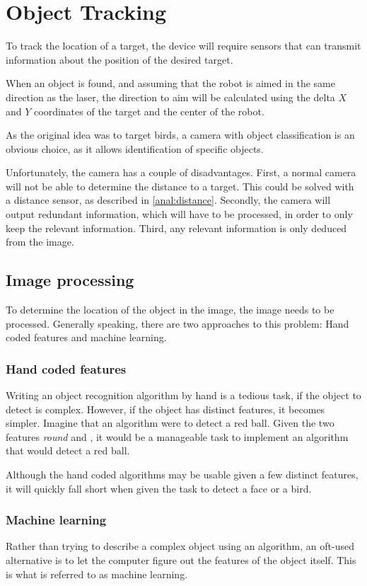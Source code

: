 \section{Object Tracking}
\label{sec:obj_tracking}
To track the location of a target, the device will require sensors that can transmit information about the position of the desired target.


When an object is found, and assuming that the robot is aimed in the same direction as the laser, the direction to aim will be calculated using the delta $X$ and $Y$ coordinates of the target and the center of the robot.

As the original idea was to target birds, a camera with object classification is an obvious choice, as it allows identification of specific objects.


Unfortunately, the camera has a couple of disadvantages.
First, a normal camera will not be able to determine the distance to a target.
This could be solved with a distance sensor, as described in \autoref{anal:distance}.
Secondly, the camera will output redundant information, which will have to be processed, in order to only keep the relevant information.
Third, any relevant information is only deduced from the image.

\subsection{Image processing}
To determine the location of the object in the image, the image needs to be processed.
Generally speaking, there are two approaches to this problem: Hand coded features and machine learning.

\subsubsection{Hand coded features}
Writing an object recognition algorithm by hand is a tedious task, if the object to detect is complex.
However, if the object has distinct features, it becomes simpler.
Imagine that an algorithm were to detect a red ball.
Given the two features \textit{round} and , it would be a manageable task to implement an algorithm that would detect a red ball.

Although the hand coded algorithms may be usable given a few distinct features, it will quickly fall short when given the task to detect a face or a bird.

\subsubsection{Machine learning}\label{sec:obj_tracking:sub:ML}
Rather than trying to describe a complex object using an algorithm, an oft-used alternative is to let the computer figure out the features of the object itself.
This is what is referred to as machine learning.

